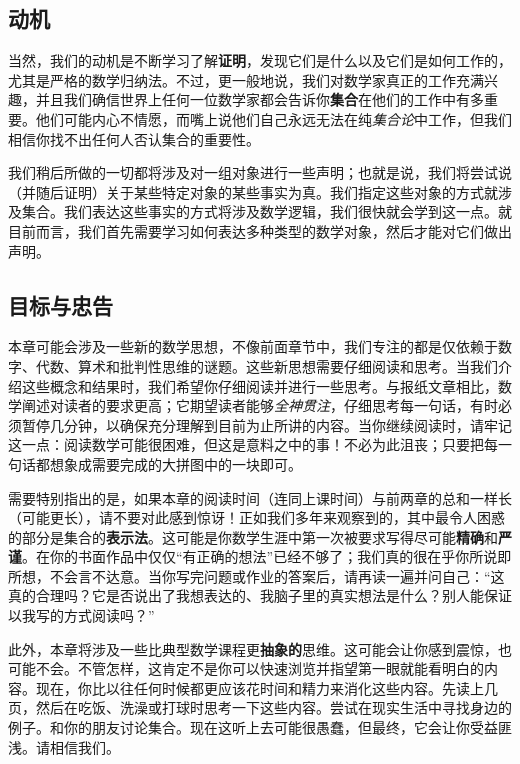 \subsection{动机}

当然，我们的动机是不断学习了解\textbf{证明}，发现它们是什么以及它们是如何工作的，尤其是严格的数学归纳法。不过，更一般地说，我们对数学家真正的工作充满兴趣，并且我们确信世界上任何一位数学家都会告诉你\textbf{集合}在他们的工作中有多重要。他们可能内心不情愿，而嘴上说他们自己永远无法在纯\textit{集合论}中工作，但我们相信你找不出任何人否认集合的重要性。

我们稍后所做的一切都将涉及对一组对象进行一些声明；也就是说，我们将尝试说（并随后证明）关于某些特定对象的某些事实为真。我们指定这些对象的方式就涉及集合。我们表达这些事实的方式将涉及数学逻辑，我们很快就会学到这一点。就目前而言，我们首先需要学习如何表达多种类型的数学对象，然后才能对它们做出声明。

\subsection{目标与忠告}

本章可能会涉及一些新的数学思想，不像前面章节中，我们专注的都是仅依赖于数字、代数、算术和批判性思维的谜题。这些新思想需要仔细阅读和思考。当我们介绍这些概念和结果时，我们希望你仔细阅读并进行一些思考。与报纸文章相比，数学阐述对读者的要求更高；它期望读者能够\textit{全神贯注}，仔细思考每一句话，有时必须暂停几分钟，以确保充分理解到目前为止所讲的内容。当你继续阅读时，请牢记这一点：阅读数学可能很困难，但这是意料之中的事！不必为此沮丧；只要把每一句话都想象成需要完成的大拼图中的一块即可。

需要特别指出的是，如果本章的阅读时间（连同上课时间）与前两章的总和一样长（可能更长），请不要对此感到惊讶！正如我们多年来观察到的，其中最令人困惑的部分是集合的\textbf{表示法}。这可能是你数学生涯中第一次被要求写得尽可能\textbf{精确}和\textbf{严谨}。在你的书面作品中仅仅“有正确的想法”已经不够了；我们真的很在乎你所说即所想，不会言不达意。当你写完问题或作业的答案后，请再读一遍并问自己：“这真的合理吗？它是否说出了我想表达的、我脑子里的真实想法是什么？别人能保证以我写的方式阅读吗？”

此外，本章将涉及一些比典型数学课程更\textbf{抽象的}思维。这可能会让你感到震惊，也可能不会。不管怎样，这肯定不是你可以快速浏览并指望第一眼就能看明白的内容。现在，你比以往任何时候都更应该花时间和精力来消化这些内容。先读上几页，然后在吃饭、洗澡或打球时思考一下这些内容。尝试在现实生活中寻找身边的例子。和你的朋友讨论集合。现在这听上去可能很愚蠢，但最终，它会让你受益匪浅。请相信我们。
